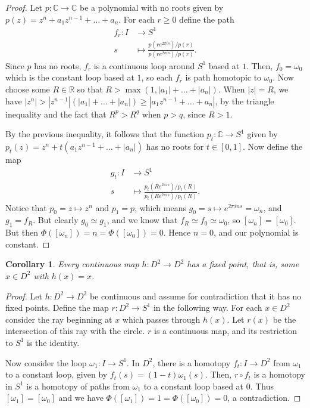 \documentclass{report}
\newtheorem{corollary}{Corollary}[section]
\theoremstyle{definition}
\theoremstyle{remark}
\newcommand{\R}{\mathbb{R}}
\newcommand{\C}{\mathbb{C}}
\let\oldmax\max
\renewcommand{\max}[1]{\oldmax \left( #1 \right)}
\begin{document}
\begin{proof}
    Let $p : \C \to \C$ be a polynomial with no roots given by $p(z) = z^n + a_1 z^{n-1} + \dots + a_n$. For each $r \geq 0$ define the path 
    \begin{align*}
        f_r : I &\to S^1 \\
        s &\mapsto \frac{p(r e^{2 \pi i s})/p(r)}{p(r e^{2 \pi i s})/p(r)}. 
    \end{align*} Since $p$ has no roots, $f_r$ is a continuous loop around $S^1$ based at $1$. Then, $f_0 = \omega_0$ which is the constant loop based at $1$, so each $f_r$ is path homotopic to $\omega_0$. Now choose some $R \in \R$ so that $R > \max{1, |a_1| + \dots + |a_n|}$. When $|z| = R$, we have $|z^n| > |z^{n-1}|(|a_1| + \dots + |a_n|) \geq |a_1 z^{n-1} + \dots + a_n|$, by the triangle inequality and the fact that $R^p > R^q$ when $p > q$, since $R > 1$.
    
    By the previous inequality, it follows that the function $p_t : \C \to S^1$ given by $p_t(z) = z^n + t(a_1 z^{n-1} + \dots + |a_n|)$ has no roots for $t \in [0, 1]$. Now define the map 
    \begin{align*}
        g_t : I &\to S^1 \\
        s &\mapsto \frac{p_t(R e^{2 \pi i s})/p_t(R)}{p_t(R e^{2 \pi i s})/p_t(R)}. 
    \end{align*} Notice that $p_0 = z \mapsto z^n$ and $p_1 = p$, which means $g_0 = s \mapsto e^{2 \pi i n s} = \omega_n$, and $g_1 = f_R$. But clearly $g_0 \simeq g_1$, and we know that $f_R \simeq f_0 \simeq \omega_0$, so $[\omega_n] = [\omega_0]$. But then $\Phi([\omega_n]) = n = \Phi([\omega_0]) = 0$. Hence $n = 0$, and our polynomial is constant.
\end{proof}

\begin{corollary}
    Every continuous map $h : D^2 \to D^2$ has a fixed point, that is, some $x \in D^2$ with $h(x) = x$.
\end{corollary}

\begin{proof}
    Let $h : D^2 \to D^2$ be continuous and assume for contradiction that it has no fixed points. Define the map $r : D^2 \to S^1$ in the following way. For each $x \in D^2$ consider the ray beginning at $x$ which passes through $h(x)$. Let $r(x)$ be the intersection of this ray with the circle. $r$ is a continuous map, and its restriction to $S^1$ is the identity.
    
    Now consider the loop $\omega_1 : I \to S^1$. In $D^2$, there is a homotopy $f_t : I \to D^2$ from $\omega_1$ to a constant loop, given by $f_t(s) = (1-t) \omega_1(s)$. Then, $r \circ f_t$ is a homotopy in $S^1$ is a homotopy of paths from $\omega_1$ to a constant loop based at $0$. Thus $[\omega_1] = [\omega_0]$ and we have $\Phi([\omega_1]) = 1 = \Phi([\omega_0]) = 0$, a contradiction.
\end{proof}
\end{document}
